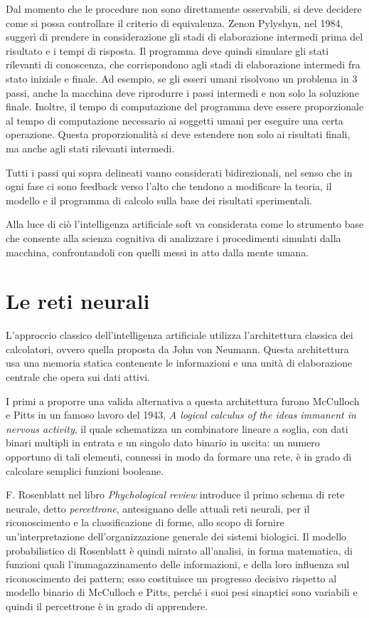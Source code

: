 Dal momento che le procedure non sono direttamente osservabili, si deve decidere come si possa controllare il criterio di equivalenza. Zenon Pylyshyn, nel 1984, suggerì di prendere in considerazione gli stadi di elaborazione intermedi prima del risultato e i tempi di risposta. Il programma deve quindi simulare gli stati rilevanti di conoscenza, che corrispondono agli stadi di elaborazione intermedi fra stato iniziale e finale. Ad esempio, se gli esseri umani risolvono un problema in 3 passi, anche la macchina deve riprodurre i passi intermedi e non solo la soluzione finale. Inoltre, il tempo di computazione del programma deve essere proporzionale al tempo di computazione necessario ai soggetti umani per eseguire una certa operazione. Questa proporzionalità si deve estendere non solo ai risultati finali, ma anche agli stati rilevanti intermedi.

Tutti i passi qui sopra delineati vanno considerati bidirezionali, nel senso che in ogni fase ci sono feedback verso l’alto che tendono a modificare la teoria, il modello e il programma di calcolo sulla base dei risultati sperimentali.

Alla luce di ciò l’intelligenza artificiale soft va considerata come lo strumento base che consente alla scienza cognitiva di analizzare i procedimenti simulati dalla macchina, confrontandoli con quelli messi in atto dalla mente umana.

\section{Le reti neurali}\label{reti-neurali}
L’approccio classico dell’intelligenza artificiale utilizza l’architettura classica dei calcolatori, ovvero quella proposta da John von Neumann. Questa architettura usa una memoria statica contenente le informazioni e una unità di elaborazione centrale che opera sui dati attivi.

I primi a proporre una valida alternativa a questa architettura furono McCulloch e Pitts in un famoso lavoro del 1943, \emph{A logical calculus of the ideas immanent in nervous activity}, il quale schematizza un combinatore lineare a soglia, con dati binari multipli in entrata e un singolo dato binario in uscita: un numero opportuno di tali elementi, connessi in modo da formare una rete, è in grado di calcolare semplici funzioni booleane.

F. Rosenblatt nel libro \emph{Phychological review} introduce il primo schema di rete neurale, detto \emph{percettrone}, antesignano delle attuali reti neurali, per il riconoscimento e la classificazione di forme, allo scopo di fornire un'interpretazione dell'organizzazione generale dei sistemi biologici. Il modello probabilistico di Rosenblatt è quindi mirato all'analisi, in forma matematica, di funzioni quali l'immagazzinamento delle informazioni, e della loro influenza sul riconoscimento dei pattern; esso costituisce un progresso decisivo rispetto al modello binario di McCulloch e Pitts, perché i suoi pesi sinaptici sono variabili e quindi il percettrone è in grado di apprendere.

